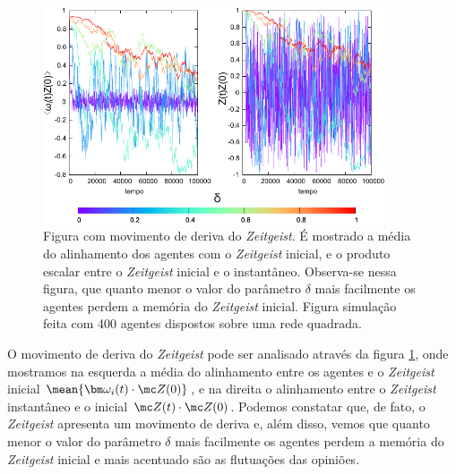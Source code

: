 \begin{figure}
\centering
\includegraphics[width=0.9\textwidth]{Figures/evolveAngulosSemFixos}
\caption{Figura com movimento de deriva do \textit{Zeitgeist}. É mostrado a
média do alinhamento dos agentes com o \textit{Zeitgeist} inicial, e o produto
escalar entre o \textit{Zeitgeist} inicial e o instantâneo. Observa-se nessa
figura, que quanto menor o valor do parâmetro $\delta$ mais facilmente
os agentes perdem a memória do \textit{Zeitgeist} inicial. Figura
simulação feita com 400 agentes dispostos sobre uma rede quadrada.}
\label{fig:evolveAngulosSemFixos}
\end{figure}

O movimento de deriva do \textit{Zeitgeist} pode ser analisado através
da figura \ref{fig:evolveAngulosSemFixos}, onde mostramos na esquerda
a média do alinhamento entre os agentes e o \textit{Zeitgeist} inicial
$\mean{\bm \omega_i(t)\cdot\mc Z(0)}$, e na direita o alinhamento entre
o \textit{Zeitgeist} instantâneo e o inicial $\mc Z(t)\cdot \mc Z(0)
$. Podemos constatar que, de fato, o \textit{Zeitgeist} apresenta um movimento
de deriva e, além disso, vemos que quanto menor o valor do parâmetro
$\delta$ mais facilmente os agentes perdem a memória do \textit{Zeitgeist}
inicial e mais acentuado são as flutuações das opiniões.

